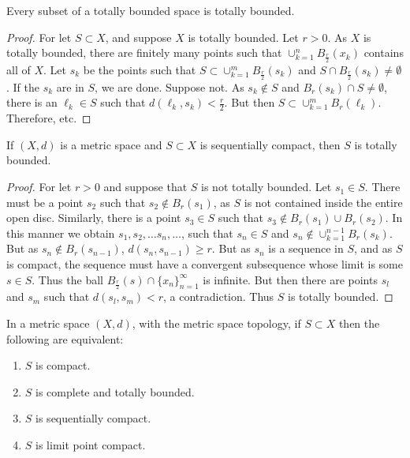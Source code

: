 \documentclass[crop=false,class=book,oneside]{standalone}
\begin{document}
            \begin{theorem}
            Every subset of a totally bounded space is totally bounded.
            \end{theorem}
            \begin{proof}
            For let $S\subset X$, and suppose $X$ is totally bounded. Let $r>0$. As $X$ is totally bounded, there are finitely many points such that $\cup_{k=1}^{n} B_{\frac{r}{2}}(x_k)$ contains all of $X$. Let $s_k$ be the points such that $S\subset \cup_{k=1}^{m} B_{\frac{r}{2}}(s_k)$ and $S\cap B_{\frac{r}{2}}(s_k) \ne \emptyset$. If the $s_k$ are in $S$, we are done. Suppose not. As $s_k \notin S$ and $B_{r}(s_k)\cap S \ne \emptyset$, there is an $\ell_k \in S$ such that $d(\ell_k,s_k)< \frac{r}{2}$. But then $S\subset \cup_{k=1}^{m} B_{r}(\ell_k)$. Therefore, etc.
            \end{proof}
            \begin{theorem}
            If $(X,d)$ is a metric space and $S\subset X$ is sequentially compact, then $S$ is totally bounded.
            \end{theorem}
            \begin{proof}
            For let $r>0$ and suppose that $S$ is not totally bounded. Let $s_1\in S$. There must be a point $s_2$ such that $s_2 \notin B_{r}(s_1)$, as $S$ is not contained inside the entire open disc. Similarly, there is a point $s_3\in S$ such that $s_3 \notin B_r(s_1)\cup B_r(s_2)$. In this manner we obtain $s_1, s_2, \hdots s_n, \hdots$, such that $s_n \in S$ and $s_n \notin \cup_{k=1}^{n-1}B_r(s_k)$. But as $s_n \notin B_r(s_{n-1})$, $d(s_n, s_{n-1})\geq r$. But as $s_n$ is a sequence in $S$, and as $S$ is compact, the sequence must have a convergent subsequence whose limit is some $s\in S$. Thus the ball $B_{\frac{r}{2}}(s)\cap \{x_n\}_{n=1}^{\infty}$ is infinite. But then there are points $s_{l}$ and $s_{m}$ such that $d(s_l,s_m)<r$, a contradiction. Thus $S$ is totally bounded.
            \end{proof}
            \begin{theorem}
            In a metric space $(X,d)$, with the metric space topology, if $S\subset X$ then the following are equivalent:
            \begin{enumerate}
            \item $S$ is compact.
            \item $S$ is complete and totally bounded.
            \item $S$ is sequentially compact.
            \item $S$ is limit point compact.
            \end{enumerate}
            \end{theorem}
\end{document}
